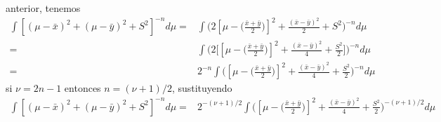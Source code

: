 \documentclass[12pt,]{article}
\begin{document}
anterior, tenemos \[
\begin{array}{rl}
\displaystyle \int[(\mu-\bar{x})^2+(\mu-\bar{y})^2+S^2]^{-n}d\mu=&\displaystyle \int \Bigg(2[\mu- \big(\frac{\bar{x}+\bar{y}}{2}\big)]^2+\frac{(\bar{x}-\bar{y})^2}{2}+S^2\Bigg)^{-n}d\mu\\
=&\displaystyle \int\bigg(2\bigg[ [\mu- \big(\frac{\bar{x}+\bar{y}}{2}\big)]^2+\frac{(\bar{x}-\bar{y})^2}{4}+\frac{S^2}{2} \bigg]\bigg)^{-n}d\mu\\
=&2^{-n}\displaystyle \int\bigg( [\mu- \big(\frac{\bar{x}+\bar{y}}{2}\big)]^2+\frac{(\bar{x}-\bar{y})^2}{4}+\frac{S^2}{2}\bigg)^{-n}d\mu
\end{array}
\] si \(\nu=2n-1\) entonces \(n=(\nu+1)/2\), sustituyendo \[
\begin{array}{rl}
\displaystyle \int[(\mu-\bar{x})^2+(\mu-\bar{y})^2+S^2]^{-n}d\mu=&2^{-(\nu+1)/2}\displaystyle \int\bigg( [\mu- \big(\frac{\bar{x}+\bar{y}}{2}\big)]^2+\frac{(\bar{x}-\bar{y})^2}{4}+\frac{S^2}{2}\bigg)^{-(\nu+1)/2}d\mu
\end{array}
\]
\end{document}
